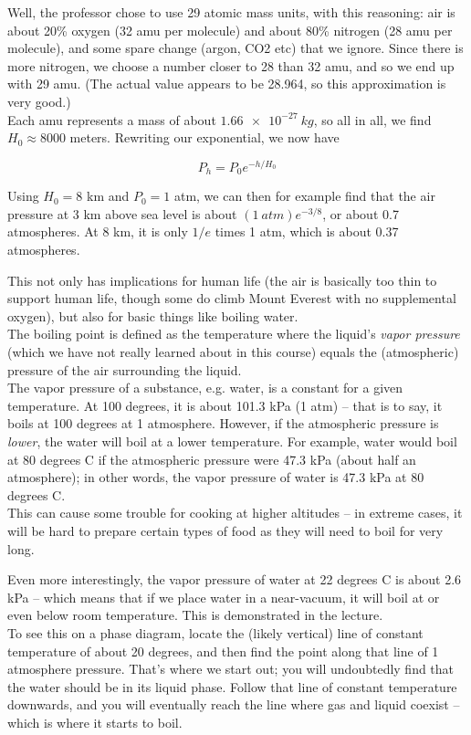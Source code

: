 Well, the professor chose to use 29 atomic mass units, with this reasoning: air is about 20\% oxygen (32 amu per molecule) and about 80\% nitrogen (28 amu per molecule), and some spare change (argon, CO2 etc) that we ignore. Since there is more nitrogen, we choose a number closer to 28 than 32 amu, and so we end up with 29 amu. (The actual value appears to be 28.964, so this approximation is very good.)\\
Each amu represents a mass of about $\SI{1.66e-27}{kg}$, so all in all, we find $H_0 \approx 8000$ meters. Rewriting our exponential, we now have

\begin{equation}
P_h = P_0 e^{- h/H_0}
\end{equation}

Using $H_0 = 8$ km and $P_0 = 1$ atm, we can then for example find that the air pressure at 3 km above sea level is about $(\SI{1}{atm})e^{-3/8}$, or about 0.7 atmospheres. At 8 km, it is only $1/e$ times 1 atm, which is about 0.37 atmospheres.

This not only has implications for human life (the air is basically too thin to support human life, though some do climb Mount Everest with no supplemental oxygen), but also for basic things like boiling water.\\
The boiling point is defined as the temperature where the liquid's \emph{vapor pressure} (which we have not really learned about in this course) equals the (atmospheric) pressure of the air surrounding the liquid.\\
The vapor pressure of a substance, e.g. water, is a constant for a given temperature. At 100 degrees, it is about 101.3 kPa (1 atm) -- that is to say, it boils at 100 degrees at 1 atmosphere. However, if the atmospheric pressure is \emph{lower}, the water will boil at a lower temperature. For example, water would boil at 80 degrees C if the atmospheric pressure were 47.3 kPa (about half an atmosphere); in other words, the vapor pressure of water is 47.3 kPa at 80 degrees C.\\
This can cause some trouble for cooking at higher altitudes -- in extreme cases, it will be hard to prepare certain types of food as they will need to boil for very long.

Even more interestingly, the vapor pressure of water at 22 degrees C is about 2.6 kPa -- which means that if we place water in a near-vacuum, it will boil at or even below room temperature. This is demonstrated in the lecture.\\
To see this on a phase diagram, locate the (likely vertical) line of constant temperature of about 20 degrees, and then find the point along that line of 1 atmosphere pressure. That's where we start out; you will undoubtedly find that the water should be in its liquid phase. Follow that line of constant temperature downwards, and you will eventually reach the line where gas and liquid coexist -- which is where it starts to boil.

